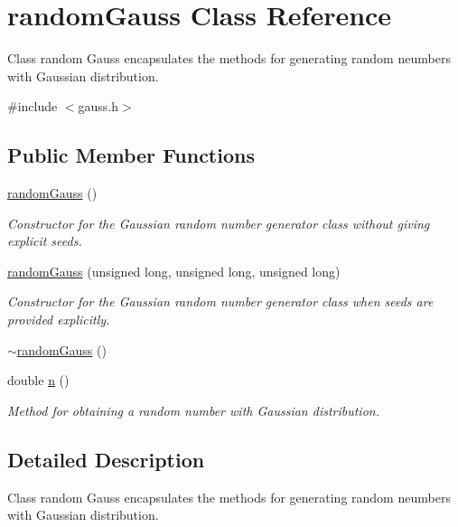 \hypertarget{classrandomGauss}{\section{random\+Gauss Class Reference}
\label{classrandomGauss}
}


Class random Gauss encapsulates the methods for generating random neumbers with Gaussian distribution.  




{\ttfamily \#include $<$gauss.\+h$>$}

\subsection*{Public Member Functions}
\begin{DoxyCompactItemize}
\item 
\hyperlink{classrandomGauss_aadeaf98f80482a1515e0faf0bb0f3094}{random\+Gauss} ()
\begin{DoxyCompactList}\small\item\em Constructor for the Gaussian random number generator class without giving explicit seeds. \end{DoxyCompactList}\item 
\hyperlink{classrandomGauss_ac7e74917c3456acef39d012b430d3438}{random\+Gauss} (unsigned long, unsigned long, unsigned long)
\begin{DoxyCompactList}\small\item\em Constructor for the Gaussian random number generator class when seeds are provided explicitly. \end{DoxyCompactList}\item 
\hyperlink{classrandomGauss_a2925cbc1ccf2cfdb91e042d8b2cc373a}{$\sim$random\+Gauss} ()
\item 
double \hyperlink{classrandomGauss_a69a70b10bc65de93f60bfb1c02a16daf}{n} ()
\begin{DoxyCompactList}\small\item\em Method for obtaining a random number with Gaussian distribution. \end{DoxyCompactList}\end{DoxyCompactItemize}


\subsection{Detailed Description}
Class random Gauss encapsulates the methods for generating random neumbers with Gaussian distribution. 

